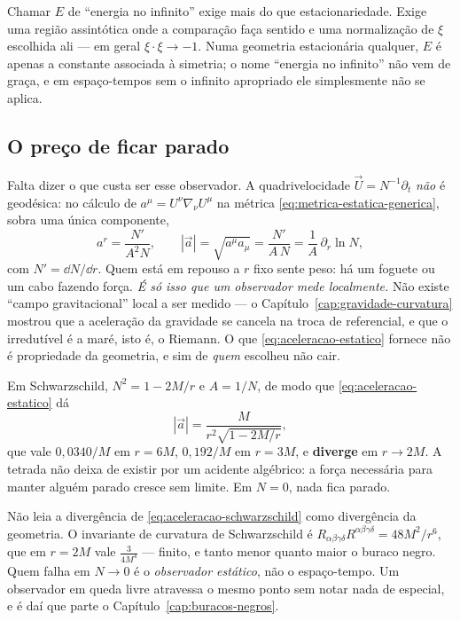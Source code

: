 \documentclass[12pt,a4paper,oneside]{book}
\theoremstyle{rgplain}
\theoremstyle{rgremark}
\begin{document}
\begin{atencao}
Chamar $E$ de ``energia no infinito'' exige mais do que estacionariedade.
Exige uma região assintótica onde a comparação faça sentido e uma
normalização de $\xi$ escolhida ali --- em geral
$\xi\cdot\xi\to-1$. Numa geometria estacionária qualquer, $E$ é apenas a
constante associada à simetria; o nome ``energia no infinito'' não vem de
graça, e em espaço-tempos sem o infinito apropriado ele simplesmente não se
aplica.
\end{atencao}

\subsection*{O preço de ficar parado}

Falta dizer o que custa ser esse observador. A quadrivelocidade
$\vec U=N^{-1}\partial_t$ \emph{não} é geodésica: no cálculo de
$a^\mu=U^\nu\nabla_\nu U^\mu$ na métrica \eqref{eq:metrica-estatica-generica},
sobra uma única componente,
\begin{equation}
  a^r=\frac{N'}{A^2N} ,
  \qquad
  |\vec a|=\sqrt{a^\mu a_\mu}=\frac{N'}{A\,N}=\frac{1}{A}\,\partial_r\ln N ,
  \label{eq:aceleracao-estatico}
\end{equation}
com $N'=\dd N/\dd r$. Quem está em repouso a $r$ fixo sente peso: há um
foguete ou um cabo fazendo força. \emph{É só isso que um observador mede
localmente.} Não existe ``campo gravitacional'' local a ser medido --- o
Capítulo~\ref{cap:gravidade-curvatura} mostrou que a aceleração da gravidade se
cancela na troca de referencial, e que o irredutível é a maré, isto é, o
Riemann. O que \eqref{eq:aceleracao-estatico} fornece não é propriedade da
geometria, e sim de \emph{quem} escolheu não cair.

Em Schwarzschild, $N^2=1-2M/r$ e $A=1/N$, de
modo que \eqref{eq:aceleracao-estatico} dá
\begin{equation}
  |\vec a|=\frac{M}{r^2\sqrt{1-2M/r}} ,
  \label{eq:aceleracao-schwarzschild}
\end{equation}
que vale $0{,}0340/M$ em $r=6M$, $0{,}192/M$ em $r=3M$, e \textbf{diverge} em
$r\to2M$. A tetrada não deixa de existir por um acidente algébrico: a força
necessária para manter alguém parado cresce sem limite.
Em $N=0$, nada fica parado.

\begin{atencao}
Não leia a divergência de \eqref{eq:aceleracao-schwarzschild} como divergência
da geometria. O invariante de curvatura de Schwarzschild é
$R_{\alpha\beta\gamma\delta}R^{\alpha\beta\gamma\delta}=48M^2/r^6$, que em
$r=2M$ vale $\frac{3}{4M^4}$ --- finito, e tanto menor quanto maior o buraco negro.
Quem falha em $N\to0$ é o \emph{observador estático}, não o espaço-tempo. Um
observador em queda livre atravessa o mesmo ponto sem notar nada de especial, e
é daí que parte o Capítulo~\ref{cap:buracos-negros}.
\end{atencao}
\end{document}
